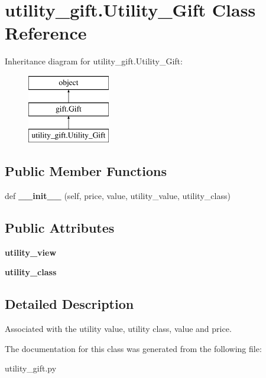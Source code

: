 \hypertarget{classutility__gift_1_1_utility___gift}{}\section{utility\+\_\+gift.\+Utility\+\_\+\+Gift Class Reference}
\label{classutility__gift_1_1_utility___gift}
Inheritance diagram for utility\+\_\+gift.\+Utility\+\_\+\+Gift\+:\begin{figure}[H]
\begin{center}
\leavevmode
\includegraphics[height=3.000000cm]{classutility__gift_1_1_utility___gift}
\end{center}
\end{figure}
\subsection*{Public Member Functions}
\begin{DoxyCompactItemize}
\item 
\mbox{\label{classutility__gift_1_1_utility___gift_aa052e2d051b6ed87c8a1063994c6d625}} 
def {\bfseries \+\_\+\+\_\+init\+\_\+\+\_\+} (self, price, value, utility\+\_\+value, utility\+\_\+class)
\end{DoxyCompactItemize}
\subsection*{Public Attributes}
\begin{DoxyCompactItemize}
\item 
\mbox{\label{classutility__gift_1_1_utility___gift_a4e6bdcfbda7e752922e9e5a9a5589aeb}} 
{\bfseries utility\+\_\+view}
\item 
\mbox{\label{classutility__gift_1_1_utility___gift_a7e3112caebf026d3e0c583504e1f5a5c}} 
{\bfseries utility\+\_\+class}
\end{DoxyCompactItemize}


\subsection{Detailed Description}
\begin{DoxyVerb}Associated with the utility value, utility class, value and price.
\end{DoxyVerb}
 

The documentation for this class was generated from the following file\+:\begin{DoxyCompactItemize}
\item 
utility\+\_\+gift.\+py\end{DoxyCompactItemize}
